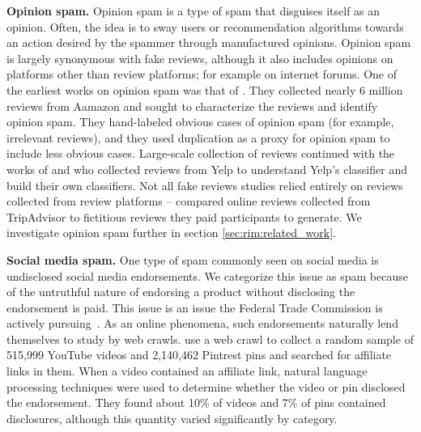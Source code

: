 
\textbf{Opinion spam.}
Opinion spam is a type of spam that disguises itself as an opinion. Often, the idea is to sway users or recommendation algorithms towards an action desired by the spammer through manufactured opinions. Opinion spam is largely synonymous with fake reviews, although it also includes opinions on platforms other than review platforms; for example on internet forums. One of the earliest works on opinion spam was that of \citet{jindal2008opinion}. They collected nearly 6 million reviews from Aamazon and sought to characterize the reviews and identify opinion spam. They hand-labeled obvious cases of opinion spam (for example, irrelevant reviews), and they used duplication as a proxy for opinion spam to include less obvious cases. Large-scale collection of reviews continued with the works of \citet{mukherjee2013yelp} and \citet{rayana2015collective} who collected reviews from Yelp to understand Yelp's classifier and build their own classifiers. Not all fake reviews studies relied entirely on reviews collected from review platforms -- \citet{ott2011finding} compared online reviews collected from TripAdvisor to fictitious reviews they paid participants to generate. We investigate opinion spam further in section \ref{sec:rim:related_work}.

\textbf{Social media spam.}
One type of spam commonly seen on social media is undisclosed social media endorsements. We categorize this issue as spam because of the untruthful nature of endorsing a product without disclosing the endorsement is paid. This issue is an issue the Federal Trade Commission is actively pursuing~\cite{ftc2021disclosures,ftc21notice}. As an online phenomena, such endorsements naturally lend themselves to study by web crawls. \citet{mathur2018endorsements} use a web crawl to collect a random sample of 515,999 YouTube videos and 2,140,462 Pintrest pins and searched for affiliate links in them. When a video contained an affiliate link, natural language processing techniques were used to determine whether the video or pin disclosed the endorsement. They found about 10\% of videos and 7\% of pins contained disclosures, although this quantity varied significantly by category.


